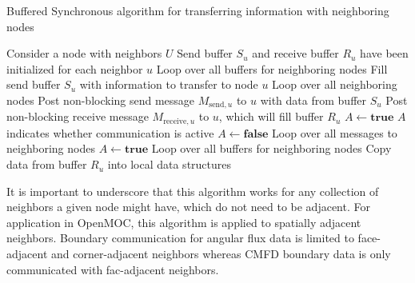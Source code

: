 \begin{algorithm*}[!h]
	\caption{Buffered Synchronous algorithm for transferring information with neighboring nodes}
	\label{alg:Buffered Synchronous}
	\begin{algorithmic}
		\State Consider a node with neighbors $U$ \hspace{\fill}
		\State Send buffer $S_u$ and receive buffer $R_u$ have been initialized for each neighbor $u$ \hspace{\fill}
		\vspace{0.1in}
		 \Comment Loop over all buffers for neighboring nodes
		\vspace{0.1in}
		\State Fill send buffer $S_u$ with information to transfer to node $u$
		\vspace{0.1in}
		\EndFor
		\vspace{0.1in}
		 \Comment Loop over all neighboring nodes
		\vspace{0.1in}
		\State Post non-blocking send message $M_{\text{send},u}$ to $u$ with data from buffer $S_u$
		\State Post non-blocking receive message $M_{\text{receive},u}$ to $u$, which will fill buffer $R_u$
		\vspace{0.1in}
		\EndFor
		\vspace{0.1in}
		\State $A \gets \textbf{true}$ \Comment $A$ indicates whether communication is active
		\vspace{0.1in}
		\State $A \gets \textbf{false}$
		 \Comment Loop over all messages to neighboring nodes
		\vspace{0.1in}
		\State $A \gets \textbf{true}$
		\EndIf
		\vspace{0.1in}
		\EndFor
		\EndWhile
		\vspace{0.1in}
		 \Comment Loop over all buffers for neighboring nodes
		\vspace{0.1in}
		\State Copy data from buffer $R_u$ into local data structures
		\vspace{0.1in}
		\EndFor
	\end{algorithmic}
\end{algorithm*}

It is important to underscore that this algorithm works for any collection of neighbors a given node might have, which do not need to be adjacent. For application in OpenMOC, this algorithm is applied to spatially adjacent neighbors. Boundary communication for angular flux data is limited to face-adjacent and corner-adjacent neighbors whereas \ac{CMFD} boundary data is only communicated with fac-adjacent neighbors.

